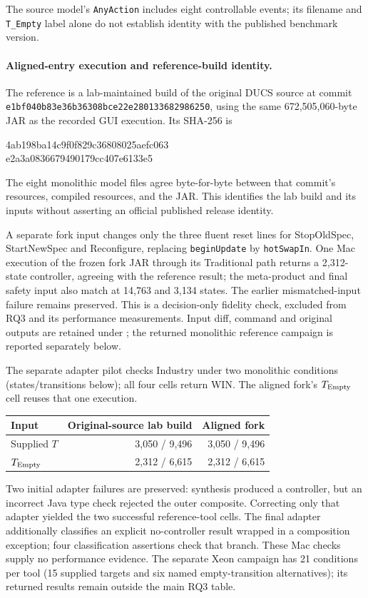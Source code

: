 \documentclass[11pt]{article}
\begin{document}
The source model's \texttt{AnyAction} includes eight controllable events; its filename and \texttt{T\_Empty} label alone do not establish identity with the published benchmark version.

\paragraph{Aligned-entry execution and reference-build identity.}
The reference is a lab-maintained build of the original DUCS source at commit
\texttt{e1bf040b83e36b36308bce22e280133682986250}, using the same 672,505,060-byte JAR as the recorded GUI execution. Its SHA-256 is
\begin{center}\small\ttfamily
4ab198ba14c9f0f829c36808025aefc063\\
e2a3a0836679490179cc407e6133e5
\end{center}
The eight monolithic model files agree byte-for-byte between that commit's resources, compiled resources, and the JAR. This identifies the lab build and its inputs without asserting an official published release identity.

A separate fork input changes only the three fluent reset lines for StopOldSpec, StartNewSpec and Reconfigure, replacing \texttt{beginUpdate} by \texttt{hotSwapIn}. One Mac execution of the frozen fork JAR through its Traditional path returns a 2,312-state controller, agreeing with the reference result; the meta-product and final safety input also match at 14,763 and 3,134 states. The earlier mismatched-input failure remains preserved. This is a decision-only fidelity check, excluded from RQ3 and its performance measurements. Input diff, command and original outputs are retained under ; the returned monolithic reference campaign is reported separately below.

The separate adapter pilot checks Industry under two monolithic conditions (states/transitions below); all four cells return WIN. The aligned fork's $T_{\rm Empty}$ cell reuses that one execution.
\begin{center}\small
\begin{tabular}{@{}lrr@{}}\toprule
Input & Original-source lab build & Aligned fork\\\midrule
Supplied $T$ & 3,050 / 9,496 & 3,050 / 9,496\\
$T_{\rm Empty}$ & 2,312 / 6,615 & 2,312 / 6,615\\\bottomrule
\end{tabular}\end{center}
Two initial adapter failures are preserved: synthesis produced a controller, but an incorrect Java type check rejected the outer composite. Correcting only that adapter yielded the two successful reference-tool cells. The final adapter additionally classifies an explicit no-controller result wrapped in a composition exception; four classification assertions check that branch. These Mac checks supply no performance evidence. The separate Xeon campaign has 21 conditions per tool (15 supplied targets and six named empty-transition alternatives); its returned results remain outside the main RQ3 table.
\end{document}
